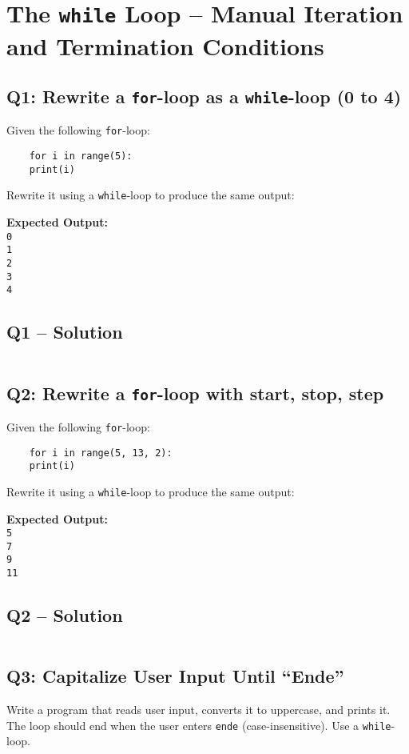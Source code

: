 \documentclass[a4paper,11pt]{article}
\begin{document}
\section{The \texttt{while} Loop – Manual Iteration and Termination Conditions}

\subsection*{Q1: Rewrite a \texttt{for}-loop as a \texttt{while}-loop (0 to 4)}
Given the following \texttt{for}-loop:

\begin{verbatim}
	for i in range(5):
	print(i)
\end{verbatim}

Rewrite it using a \texttt{while}-loop to produce the same output:

\textbf{Expected Output:}\\
\texttt{0\\1\\2\\3\\4}

\subsection*{Q1 – Solution}
\inputminted{python}{Files/5/1.py}


\subsection*{Q2: Rewrite a \texttt{for}-loop with start, stop, step}
Given the following \texttt{for}-loop:

\begin{verbatim}
	for i in range(5, 13, 2):
	print(i)
\end{verbatim}

Rewrite it using a \texttt{while}-loop to produce the same output:

\textbf{Expected Output:}\\
\texttt{5\\7\\9\\11}


\subsection*{Q2 – Solution}
\inputminted{python}{Files/5/2.py}

\subsection*{Q3: Capitalize User Input Until “Ende”}
Write a program that reads user input, converts it to uppercase, and prints it. The loop should end when the user enters \texttt{ende} (case-insensitive). Use a \texttt{while}-loop.
\end{document}
